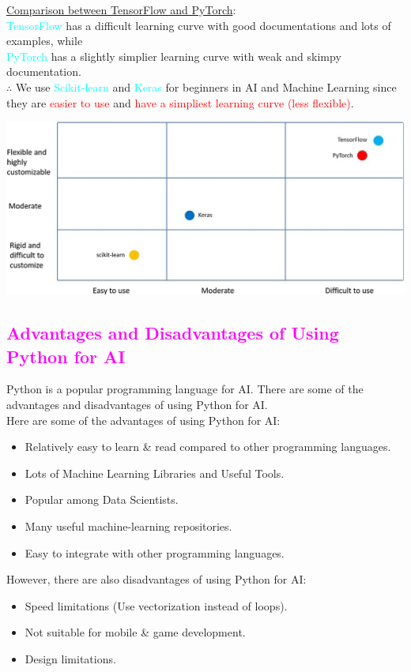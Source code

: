 \documentclass{book}
\begin{document}
\uline{Comparison between TensorFlow and PyTorch}: \\
\vspace{1mm}
\textcolor{cyan}{TensorFlow} has a difficult learning curve with good documentations and lots of examples, while \\
\textcolor{cyan}{PyTorch} has a slightly simplier learning curve with weak and skimpy documentation.\\
\vspace{1mm}
$\therefore$ We use \textcolor{cyan}{Scikit-learn} and \textcolor{cyan}{Keras} for beginners in AI and Machine Learning since they are \textcolor{red}{easier to use} and \textcolor{red}{have a simpliest learning curve (less flexible)}.
\begin{center}
    \includegraphics[scale=0.2]{tensorflow_vs_pytorch.jpeg}
\end{center}
\textcolor{magenta}{\section{\textbf{Advantages and Disadvantages of Using Python for AI}}}
Python is a popular programming language for AI. There are some of the advantages and disadvantages of using Python for AI.\\
Here are some of the advantages of using Python for AI:
\begin{itemize}
    \item Relatively easy to learn \& read compared to other programming languages.
    \item Lots of Machine Learning Libraries and Useful Tools.
    \item Popular among Data Scientists.
    \item Many useful machine-learning repositories.
    \item Easy to integrate with other programming languages.
\end{itemize}
However, there are also disadvantages of using Python for AI:
\begin{itemize}
    \item Speed limitations (Use vectorization instead of loops).
    \item Not suitable for mobile \& game development.
    \item Design limitations.
\end{itemize}
\end{document}

